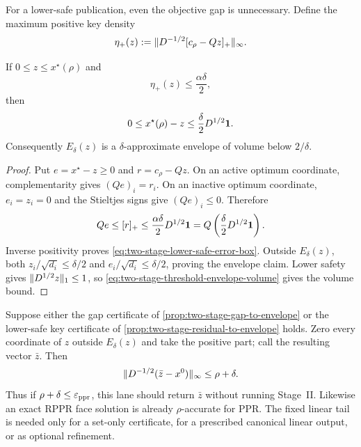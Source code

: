 For a lower-safe publication, even the objective gap is unnecessary.  Define
the maximum positive key density
\begin{equation}
 \eta_+(z):=\lVert D^{-1/2}[c_\rho-Qz]_+\rVert_\infty.
 \label{eq:two-stage-positive-key-density}
\end{equation}

\begin{proposition}
\label{prop:two-stage-residual-to-envelope}
If $0\leq z\leq x^\star(\rho)$ and
\begin{equation}
 \eta_+(z)\leq\frac{\alpha\delta}{2},
 \label{eq:two-stage-residual-handoff}
\end{equation}
then
\begin{equation}
 0\leq x^\star(\rho)-z
 \leq\frac\delta2D^{1/2}\mathbf{1}.
 \label{eq:two-stage-lower-safe-error-box}
\end{equation}
Consequently $E_\delta(z)$ is a $\delta$-approximate envelope of volume below
$2/\delta$.
\end{proposition}

\begin{proof}
Put $e=x^\star-z\geq0$ and $r=c_\rho-Qz$.  On an active optimum coordinate,
complementarity gives $(Qe)_i=r_i$.  On an inactive optimum coordinate,
$e_i=z_i=0$ and the Stieltjes signs give $(Qe)_i\leq0$.  Therefore
\begin{equation*}
 Qe\leq[r]_+
 \leq\frac{\alpha\delta}{2}D^{1/2}\mathbf{1}
 =Q\left(\frac\delta2D^{1/2}\mathbf{1}\right).
\end{equation*}
Inverse positivity proves \cref{eq:two-stage-lower-safe-error-box}.  Outside
$E_\delta(z)$, both $z_i/\sqrt{d_i}\leq\delta/2$ and
$e_i/\sqrt{d_i}\leq\delta/2$, proving the envelope claim.  Lower safety gives
$\lVert D^{1/2}z\rVert_1\leq1$, so
\cref{eq:two-stage-threshold-envelope-volume} gives the volume bound.
\end{proof}

\begin{corollary}
\label{cor:two-stage-numerical-handoff-returns}
Suppose either the gap certificate of
\cref{prop:two-stage-gap-to-envelope} or the lower-safe key certificate of
\cref{prop:two-stage-residual-to-envelope} holds.  Zero every coordinate of
$z$ outside $E_\delta(z)$ and take the positive part; call the resulting
vector $\bar z$.  Then
\begin{equation}
 \lVert D^{-1/2}(\bar z-x^0)\rVert_\infty\leq\rho+\delta.
 \label{eq:two-stage-numerical-early-output}
\end{equation}
Thus if $\rho+\delta\leq\varepsilon_{\mathrm{ppr}}$, this lane should return $\bar z$ without
running Stage~II.  Likewise an exact RPPR face solution is already
$\rho$-accurate for PPR.  The fixed linear tail is needed only for a set-only
certificate, for a prescribed canonical linear output, or as optional
refinement.
\end{corollary}

